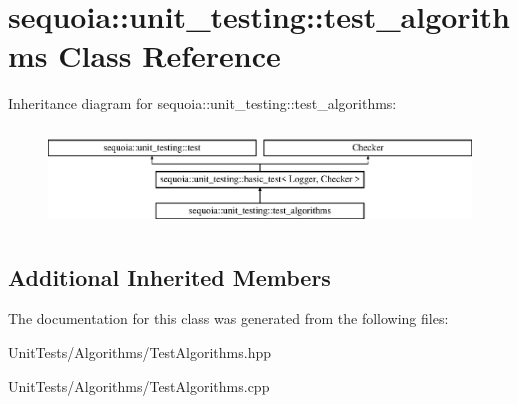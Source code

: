 \hypertarget{classsequoia_1_1unit__testing_1_1test__algorithms}{}\section{sequoia\+::unit\+\_\+testing\+::test\+\_\+algorithms Class Reference}
\label{classsequoia_1_1unit__testing_1_1test__algorithms}
Inheritance diagram for sequoia\+::unit\+\_\+testing\+::test\+\_\+algorithms\+:\begin{figure}[H]
\begin{center}
\leavevmode
\includegraphics[height=2.666667cm]{classsequoia_1_1unit__testing_1_1test__algorithms}
\end{center}
\end{figure}
\subsection*{Additional Inherited Members}


The documentation for this class was generated from the following files\+:\begin{DoxyCompactItemize}
\item 
Unit\+Tests/\+Algorithms/Test\+Algorithms.\+hpp\item 
Unit\+Tests/\+Algorithms/Test\+Algorithms.\+cpp\end{DoxyCompactItemize}

